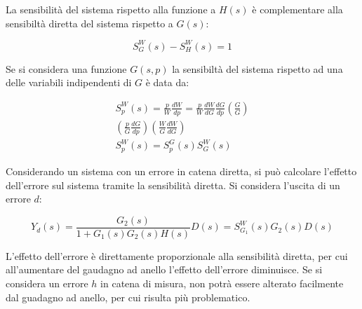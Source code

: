 \documentclass{article}
\numberwithin{equation}{subsection}
\begin{document}
La sensibilità del sistema rispetto alla funzione a $H(s)$ è complementare alla sensibiltà diretta del sistema rispetto a $G(s)$:

\begin{equation}
    S^W_G(s)-S^W_H(s)=1
\end{equation}

Se si considera una funzione $G(s,p)$ la sensibiltà del sistema rispetto ad una delle variabili indipendenti di $G$ è data da:

\begin{gather}
    S^W_p(s)=\displaystyle\frac{p}{W}\frac{dW}{dp}=\frac{p}{W}\frac{dW}{dG}\frac{dG}{dp}\left(\frac{G}{G}\right)\\
    \left(\frac{p}{G}\frac{dG}{dp}\right)\left(\frac{W}{G}\frac{dW}{dG}\right)\\
    S^W_p(s)=S^G_p(s)S^W_G(s)
\end{gather}

Considerando un sistema con un errore in catena diretta, si può calcolare l'effetto dell'errore sul sistema tramite la sensibilità diretta. Si considera l'uscita 
di un errore $d$:

\begin{equation}
    Y_d(s)=\displaystyle\frac{G_2(s)}{1+G_1(s)G_2(s)H(s)}D(s)=S^W_{G_1}(s)G_2(s)D(s)
\end{equation}

L'effetto dell'errore è direttamente proporzionale alla sensibilità diretta, per cui all'aumentare del gaudagno ad anello l'effetto dell'errore diminuisce.  
Se si considera un errore $h$ in catena di misura, non potrà essere alterato facilmente dal guadagno ad anello, per cui risulta più problematico. 
\end{document}
